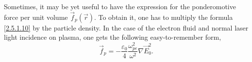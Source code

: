 Sometimes, it may be yet useful to have the expression for the ponderomotive force per unit volume $ \vec{f}_{p} \left( \vec{r} \right) $. To obtain it, one has to multiply the formula \ref{2.5.1.10} by the particle density. In the case of the electron fluid and normal laser light incidence on plasma, one gets the following easy-to-remember form,
\begin{equation}
\vec{f}_{p} = - \frac{\varepsilon_0}{4} \frac{\omega_{pe}^{2}}{\omega^{2}} \nabla \vec{E}_0^{2}.
\end{equation}